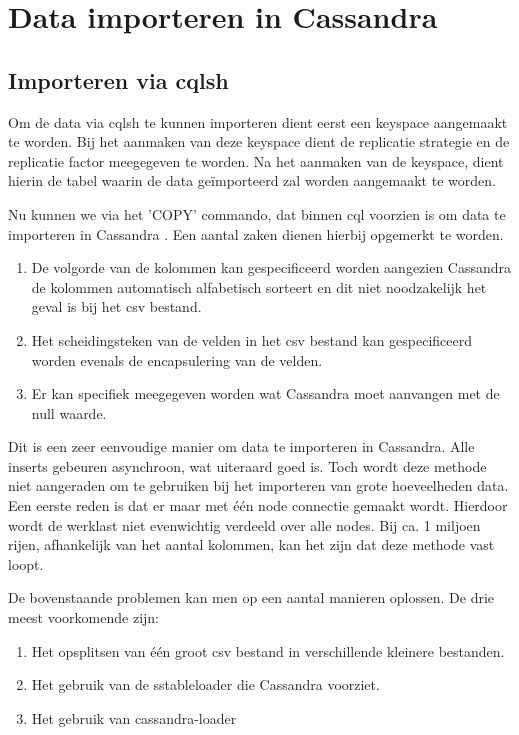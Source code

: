 \chapter{Data importeren in Cassandra}
\label{ch:cassandra_import}

\section{Importeren via cqlsh}
Om de data via cqlsh te kunnen importeren dient eerst een keyspace aangemaakt te worden.
Bij het aanmaken van deze keyspace dient de replicatie strategie en de replicatie factor meegegeven te worden.
Na het aanmaken van de keyspace, dient hierin de tabel waarin de data geïmporteerd zal  worden aangemaakt te worden.

Nu kunnen we via het 'COPY' commando, dat binnen cql voorzien is om data te importeren in Cassandra \citep{Cannon2012Import}.
Een aantal zaken dienen hierbij opgemerkt te worden.

\begin{enumerate}
	\item De volgorde van de kolommen kan gespecificeerd worden aangezien Cassandra de kolommen automatisch alfabetisch sorteert en dit niet noodzakelijk het geval is bij het csv bestand.
	\item Het scheidingsteken van de velden in het csv bestand kan gespecificeerd worden evenals de encapsulering van de velden.
	\item Er kan specifiek meegegeven worden wat Cassandra moet aanvangen met de null waarde.
\end{enumerate}

Dit is een zeer eenvoudige manier om data te importeren in Cassandra.
Alle inserts gebeuren asynchroon, wat uiteraard goed is.
Toch wordt deze methode niet aangeraden om te gebruiken bij het importeren van grote hoeveelheden data.
Een eerste reden is dat er maar met één node connectie gemaakt wordt.
Hierdoor wordt de werklast niet evenwichtig verdeeld over alle nodes.
Bij ca. 1 miljoen rijen, afhankelijk van het aantal kolommen, kan het zijn dat deze methode vast loopt.

De bovenstaande problemen kan men op een aantal manieren oplossen.
De drie meest voorkomende zijn:

\begin{enumerate}
	\item Het opsplitsen van één groot csv bestand in verschillende kleinere bestanden.
	\item Het gebruik van de sstableloader die Cassandra voorziet.
	\item Het gebruik van cassandra-loader
\end{enumerate}

